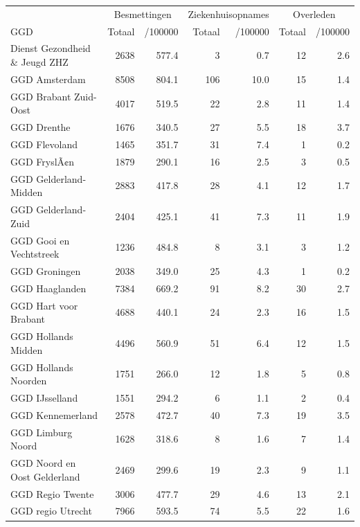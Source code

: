 \documentclass[
  english,
  man,floatsintext]{apa6}
\begin{document}
\begin{table}[H]
\centering\begingroup\fontsize{10}{12}\selectfont

\begin{threeparttable}
\begin{tabular}{lrrrrrr}
\toprule
\multicolumn{1}{c}{ } & \multicolumn{2}{c}{Besmettingen} & \multicolumn{2}{c}{Ziekenhuisopnames} & \multicolumn{2}{c}{Overleden} \\
\cmidrule(l{3pt}r{3pt}){2-3} \cmidrule(l{3pt}r{3pt}){4-5} \cmidrule(l{3pt}r{3pt}){6-7}
GGD & Totaal & /100000 & Totaal & /100000 & Totaal & /100000\\
\midrule
Dienst Gezondheid \& Jeugd ZHZ & 2638 & 577.4 & 3 & 0.7 & 12 & 2.6\\
GGD Amsterdam & 8508 & 804.1 & 106 & 10.0 & 15 & 1.4\\
GGD Brabant Zuid-Oost & 4017 & 519.5 & 22 & 2.8 & 11 & 1.4\\
GGD Drenthe & 1676 & 340.5 & 27 & 5.5 & 18 & 3.7\\
GGD Flevoland & 1465 & 351.7 & 31 & 7.4 & 1 & 0.2\\
GGD FryslÃ¢n & 1879 & 290.1 & 16 & 2.5 & 3 & 0.5\\
GGD Gelderland-Midden & 2883 & 417.8 & 28 & 4.1 & 12 & 1.7\\
GGD Gelderland-Zuid & 2404 & 425.1 & 41 & 7.3 & 11 & 1.9\\
GGD Gooi en Vechtstreek & 1236 & 484.8 & 8 & 3.1 & 3 & 1.2\\
GGD Groningen & 2038 & 349.0 & 25 & 4.3 & 1 & 0.2\\
GGD Haaglanden & 7384 & 669.2 & 91 & 8.2 & 30 & 2.7\\
GGD Hart voor Brabant & 4688 & 440.1 & 24 & 2.3 & 16 & 1.5\\
GGD Hollands Midden & 4496 & 560.9 & 51 & 6.4 & 12 & 1.5\\
GGD Hollands Noorden & 1751 & 266.0 & 12 & 1.8 & 5 & 0.8\\
GGD IJsselland & 1551 & 294.2 & 6 & 1.1 & 2 & 0.4\\
GGD Kennemerland & 2578 & 472.7 & 40 & 7.3 & 19 & 3.5\\
GGD Limburg Noord & 1628 & 318.6 & 8 & 1.6 & 7 & 1.4\\
GGD Noord en Oost Gelderland & 2469 & 299.6 & 19 & 2.3 & 9 & 1.1\\
GGD Regio Twente & 3006 & 477.7 & 29 & 4.6 & 13 & 2.1\\
GGD regio Utrecht & 7966 & 593.5 & 74 & 5.5 & 22 & 1.6\\

\end{tabular}
\end{threeparttable}
\end{table}
\end{document}
